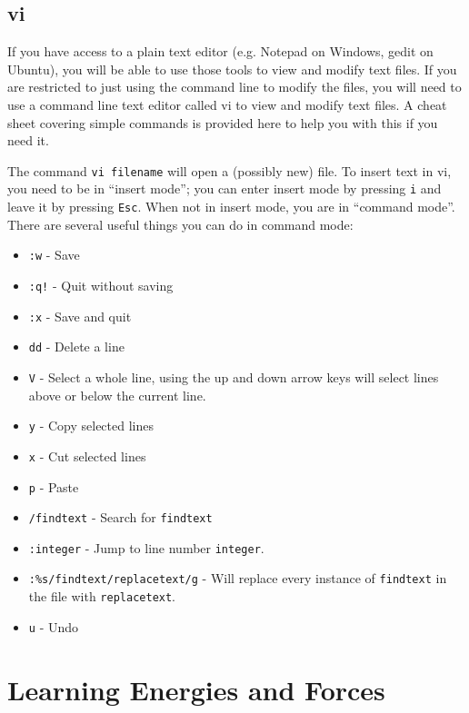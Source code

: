 \documentclass{article}
\begin{document}
\subsection{vi}

If you have access to a plain text editor (e.g. Notepad on Windows, gedit on Ubuntu), you will be able to use those tools to view and modify text files. If you are restricted to just using the command line to modify the files, you will need to use a command line text editor called vi to view and modify text files. A cheat sheet covering simple commands is provided here to help you with this if you need it.

The command \texttt{vi filename} will open a (possibly new) file. To insert text in vi, you need to be in ``insert mode''; you can enter insert mode by pressing \texttt{i} and leave it by pressing \texttt{Esc}. When not in insert mode, you are in ``command mode''. There are several useful things you can do in command mode:
\begin{itemize}
    \item \texttt{:w} - Save
    \item \texttt{:q!} - Quit without saving
    \item \texttt{:x} - Save and quit
    \item \texttt{dd} - Delete a line
    \item \texttt{V} - Select a whole line, using the up and down arrow keys will select lines above or below the current line.
    \item \texttt{y} - Copy selected lines
    \item \texttt{x} - Cut selected lines
    \item \texttt{p} - Paste
    \item \texttt{/findtext} - Search for \texttt{findtext}
    \item \texttt{:integer} - Jump to line number \texttt{integer}.
    \item \texttt{:\%s/findtext/replacetext/g} - Will replace every instance of \texttt{findtext} in the file with \texttt{replacetext}.
    \item \texttt{u} - Undo
\end{itemize}

\section{Learning Energies and Forces}
\end{document}
